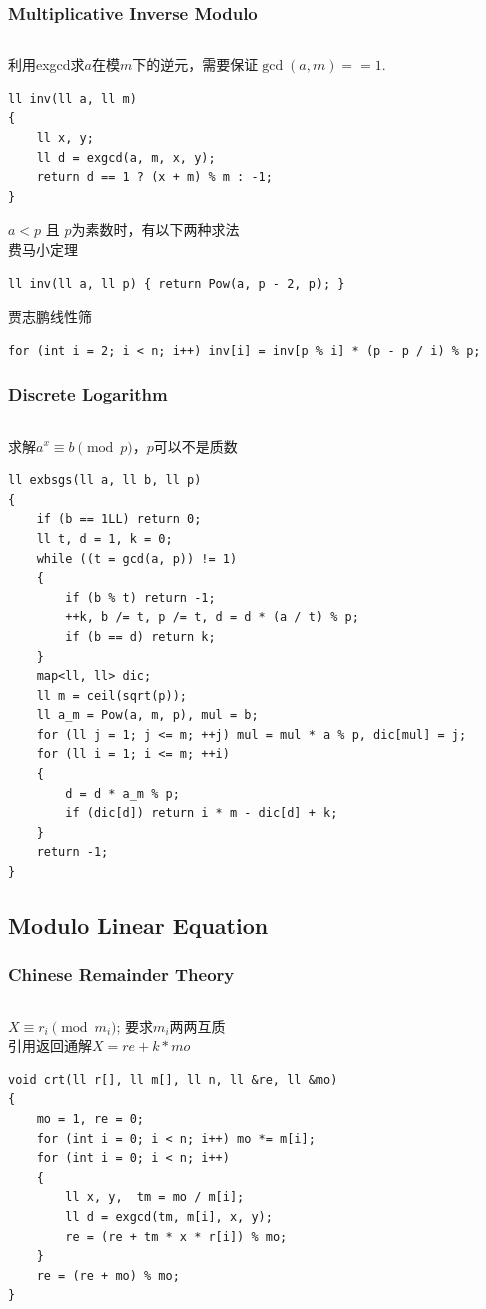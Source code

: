 \documentclass[twoside]{article}
\begin{document}
\subsubsection{Multiplicative Inverse Modulo}
\begin{lstlisting}
\end{lstlisting}
利用exgcd求$a$在模$m$下的逆元，需要保证$\gcd(a, m) == 1$.
\begin{lstlisting}
ll inv(ll a, ll m)
{
    ll x, y;
    ll d = exgcd(a, m, x, y);
    return d == 1 ? (x + m) % m : -1;
}
\end{lstlisting}
$a < p$ 且 $p$为素数时，有以下两种求法\\
费马小定理
\begin{lstlisting}
ll inv(ll a, ll p) { return Pow(a, p - 2, p); }
\end{lstlisting}
贾志鹏线性筛
\begin{lstlisting}
for (int i = 2; i < n; i++) inv[i] = inv[p % i] * (p - p / i) % p;
\end{lstlisting}
\subsubsection{Discrete Logarithm}
\begin{lstlisting}
\end{lstlisting}
求解$a ^ x \equiv b \pmod p$，$p$可以不是质数
\begin{lstlisting}
ll exbsgs(ll a, ll b, ll p)
{
    if (b == 1LL) return 0;
    ll t, d = 1, k = 0;
    while ((t = gcd(a, p)) != 1)
    {
        if (b % t) return -1;
        ++k, b /= t, p /= t, d = d * (a / t) % p;
        if (b == d) return k;
    }
    map<ll, ll> dic;
    ll m = ceil(sqrt(p));
    ll a_m = Pow(a, m, p), mul = b;
    for (ll j = 1; j <= m; ++j) mul = mul * a % p, dic[mul] = j;
    for (ll i = 1; i <= m; ++i)
    {
        d = d * a_m % p;
        if (dic[d]) return i * m - dic[d] + k;
    }
    return -1;
}\end{lstlisting}
\subsection{Modulo Linear Equation}
\subsubsection{Chinese Remainder Theory}
\begin{lstlisting}
\end{lstlisting}
$X \equiv r_i \pmod {m_i}$; 要求$m_i$两两互质\\
引用返回通解$X = re + k * mo$
\begin{lstlisting}
void crt(ll r[], ll m[], ll n, ll &re, ll &mo)
{
    mo = 1, re = 0;
    for (int i = 0; i < n; i++) mo *= m[i];
    for (int i = 0; i < n; i++)
    {
        ll x, y,  tm = mo / m[i];
        ll d = exgcd(tm, m[i], x, y);
        re = (re + tm * x * r[i]) % mo;
    }
    re = (re + mo) % mo;
}
\end{lstlisting}
\end{document}
